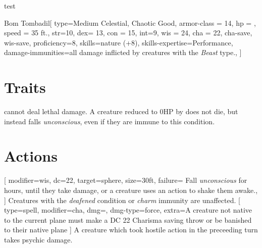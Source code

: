 \begin{ExampleBlock}{test}
\begin{RpgStat}{Bom Tombadil}[
        type={Medium Celestial, Chaotic Good},
        armor-class = {14},
        hp  = {},
        speed       = {35 ft.},
        str=10,  dex=  13,  con = 15,  int=9,  wis = 24, cha  = 22,
        cha-save, wis-save,
        proficiency=8,
        skills={nature (+8)},
        skills-expertise={Performance},
        damage-immunities={all damage inflicted by creatures with the \textit{Beast} type.},
    ]
    \section{Traits}        
         \RpgStatName{} cannot deal lethal damage. A creature reduced to 0HP by \RpgStatName{} does not die, but instead falls \textit{unconscious}, even if they are immune to this condition.
    \section{Actions}
        [
            modifier=wis,
            dc=22,
            target=sphere,
            size=30ft,
            failure= {Fall \textit{unconscious} for  hours, until they take damage, or a creature uses an action to shake them awake.},
        ] Creatures with the \textit{deafened} condition or \textit{charm} immunity are unaffected.
        [
            type=spell, modifier=cha,
            dmg=, dmg-type=force,
            extra={A creature not native to the current plane must make a DC 22 Charisma saving throw or be banished to their native plane}
        ]
    \RpgStatLegendarySection{}
        \RpgLegendaryDefiance{}
         A creature which took hostile action in the preceeding turn takes  psychic damage.
\end{RpgStat}
\end{ExampleBlock}
